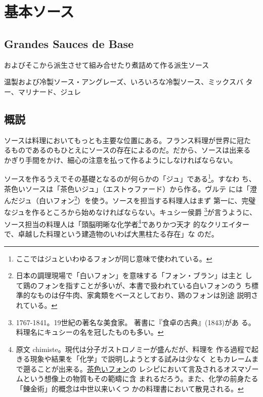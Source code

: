 \documentclass[twoside,12Q,b5j]{escoffierltjsbook}
\begin{document}
\section{基本ソース}\label{ux57faux672cux30bdux30fcux30b9}

\subsection{Grandes Sauces de Base}\label{grandes-sauces-de-base}


およびそこから派生させて組み合せたり煮詰めて作る派生ソース

温製および冷製ソース・アングレーズ、いろいろな冷製ソース、ミックスバ
ター、マリナード、ジュレ

\subsection{概説}\label{ux6982ux8aac}

ソースは料理においてもっとも主要な位置にある。フランス料理が世界に冠た
るものであるのもひとえにソースの存在によるのだ。だから、ソースは出来る
かぎり手間をかけ、細心の注意を払って作るようにしなければならない。

ソースを作るうえでその基礎となるのが何らかの「ジュ」である\footnote{ここではジュといわゆるフォンが同じ意味で使われている。}。すなわ
ち、茶色いソースは「茶色いジュ」（エストゥファード）から作る。ヴルテ
には「澄んだジュ（白いフォン\footnote{日本の調理現場で「白いフォン」を意味する「フォン・ブラン」は主と
  して鶏のフォンを指すことが多いが、本書で扱われている白いフォンのう
  ち標準的なものは仔牛肉、家禽類をベースとしており、鶏のフォンは別途
  説明されている。}）を使う。ソースを担当する料理人はまず
第一に、完璧なジュを作るところから始めなければならない。キュシー侯爵
\footnote{1767-1841。19世紀の著名な美食家。
  著書に『食卓の古典』(1843)があ
  る。料理名にキュシーの名を冠したものも多い。}が言うように、ソース担当の料理人は「頭脳明晰な化学者\footnote{原文
  chimiste。現代は分子ガストロノミーが盛んだが、料理を
  作る過程で起きる現象や結果を「化学」で説明しようとする試みは少なく
  ともカレームまで遡ることが出来る。\protect\hyperlink{fonds-brun-ou-estoufffade}{茶色いフォン}の
  レシピにおいて言及されるオスマゾームという想像上の物質もその範疇に含
  まれるだろう。また、化学の前身たる「錬金術」的概念は中世以来いくつ
  かの料理書において散見される。}でありかつ天才
的なクリエイターで、卓越した料理という建造物のいわば大黒柱たる存在」な
のだ。
\end{document}
